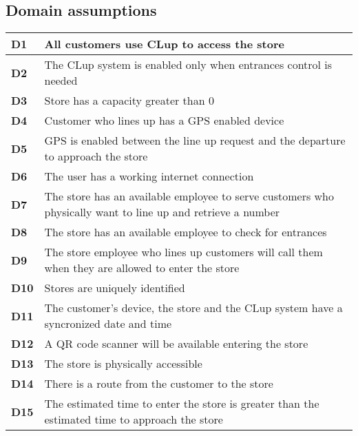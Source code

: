 \subsection{Domain assumptions}

    \begin{center}
        {\renewcommand{\arraystretch}{2}%
        \begin{tabular}{L{2cm}L{12cm}}
            \hline
            \textbf{D1} & All customers use CLup to access the store \\
            \hline
            \textbf{D2} & The CLup system is enabled only when entrances control is needed \\
            \hline
            \textbf{D3} & Store has a capacity greater than 0 \\
            \hline
            \textbf{D4} & Customer who lines up has a GPS enabled device \\
            \hline
            \textbf{D5} & GPS is enabled between the line up request and the departure to approach the store \\
            \hline
            \textbf{D6} & The user has a working internet connection \\
            \hline
            \textbf{D7} & The store has an available employee to serve customers who physically want to line up and retrieve a number \\
            \hline
            \textbf{D8} & The store has an available employee to check for entrances \\
            \hline
            \textbf{D9} & The store employee who lines up customers will call them when they are allowed to enter the store \\
            \hline
            \textbf{D10} & Stores are uniquely identified \\
            \hline
            \textbf{D11} & The customer's device, the store and the CLup system have a syncronized date and time \\
            \hline
            \textbf{D12} & A QR code scanner will be available entering the store \\
            \hline
            \textbf{D13} & The store is physically accessible \\
            \hline
            \textbf{D14} & There is a route from the customer to the store \\
            \hline
            \textbf{D15} & The estimated time to enter the store is greater than the estimated time to approach the store \\

\end{tabular}}
\end{center}
